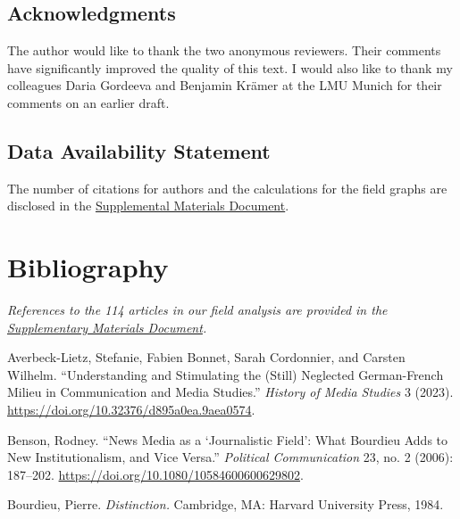\documentclass{tufte-handout}
\begin{document}
{{{{\hypertarget{acknowledgments}{%
\subsection{Acknowledgments}\label{acknowledgments}}

The author would like to thank the two anonymous reviewers. Their
comments have significantly improved the quality of this text. I would
also like to thank my colleagues Daria Gordeeva and Benjamin Krämer at
the LMU Munich for their comments on an earlier draft.

\hypertarget{data-availability-statement}{%
\subsection{Data Availability
Statement}\label{data-availability-statement}}

The number of citations for authors and the calculations for the field
graphs are disclosed in the
\href{https://hms.mediastudies.press/pub/mirbach-supplementary/release/1}{Supplemental
Materials Document}.

\vspace{.5em}

\section{Bibliography}\label{bibliography}

\emph{References to the 114 articles in our field analysis are provided in the
  \href{https://hms.mediastudies.press/pub/mirbach-supplementary/release/1}{Supplementary Materials Document}.}

  \vspace{.6em}


\begin{hangparas}{.25in}{1} 


  

Averbeck-Lietz, Stefanie, Fabien Bonnet, Sarah Cordonnier, and Carsten
Wilhelm. ``Understanding and Stimulating the (Still) Neglected
German-French Milieu in Communication and Media Studies.'' \emph{History
of Media Studies} 3 (2023).
\url{https://doi.org/10.32376/d895a0ea.9aea0574}.

Benson, Rodney. ``News Media as a `Journalistic Field': What Bourdieu
Adds to New Institutionalism, and Vice Versa.'' \emph{Political
Communication} 23, no. 2 (2006): 187--202.
\url{https://doi.org/10.1080/10584600600629802}.

Bourdieu, Pierre. \emph{Distinction.} Cambridge, MA: Harvard University
Press, 1984.


\end{hangparas}}}}}
\end{document}
